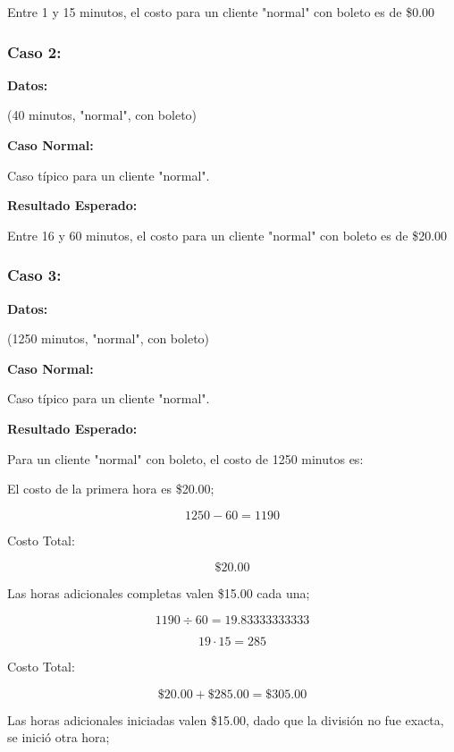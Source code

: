 \documentclass[11pt,letterpaper]{article}
\begin{document}
Entre 1 y 15 minutos, el costo para un cliente "normal" con boleto es de \$0.00


\subsubsection{Caso 2:}
\label{sec:org12d2c4a}

\textbf{Datos:}

(40 minutos, "normal", con boleto)

\textbf{Caso Normal:}

Caso típico para un cliente "normal".

\textbf{Resultado Esperado:}

Entre 16 y 60 minutos, el costo para un cliente "normal" con boleto es de \$20.00


\subsubsection{Caso 3:}
\label{sec:org2348762}

\textbf{Datos:}

(1250 minutos, "normal", con boleto)

\textbf{Caso Normal:}

Caso típico para un cliente "normal".

\textbf{Resultado Esperado:}

Para un cliente "normal" con boleto, el costo de 1250 minutos es:

El costo de la primera hora es \$20.00;

\[
   1250 - 60 = 1190
\]



Costo Total:

\[
   \text{\$}20.00
\]

Las horas adicionales completas valen \$15.00 cada una;

\[
   1190 \div 60 = 19.83333333333
\]

\[
   19 \cdot 15 = 285
\]



Costo Total:

\[
   \text{\$}20.00 + \text{\$}285.00 = \text{\$}305.00
\]

Las horas adicionales iniciadas valen \$15.00, dado que la división no fue exacta, se inició otra hora;


\end{document}
